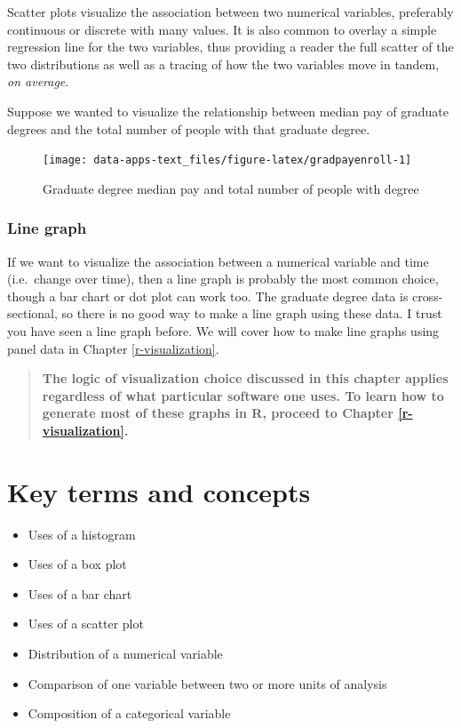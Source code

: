 \documentclass[
]{book}
\providecommand{\tightlist}{%
  \setlength{\itemsep}{0pt}\setlength{\parskip}{0pt}}
\begin{document}
Scatter plots visualize the association between two numerical variables, preferably continuous or discrete with many values. It is also common to overlay a simple regression line for the two variables, thus providing a reader the full scatter of the two distributions as well as a tracing of how the two variables move in tandem, \emph{on average}.

Suppose we wanted to visualize the relationship between median pay of graduate degrees and the total number of people with that graduate degree.

\begin{figure}

{\centering \texttt{[image: data-apps-text\_files/figure-latex/gradpayenroll-1]} 

}

\caption{Graduate degree median pay and total number of people with degree}\label{fig:gradpayenroll}
\end{figure}

\hypertarget{line-graph}{%
\subsubsection{Line graph}\label{line-graph}}

If we want to visualize the association between a numerical variable and time (i.e.~change over time), then a line graph is probably the most common choice, though a bar chart or dot plot can work too. The graduate degree data is cross-sectional, so there is no good way to make a line graph using these data. I trust you have seen a line graph before. We will cover how to make line graphs using panel data in Chapter \ref{r-visualization}.

\begin{quote}
\textbf{The logic of visualization choice discussed in this chapter applies regardless of what particular software one uses. To learn how to generate most of these graphs in R, proceed to Chapter \ref{r-visualization}.}
\end{quote}

\hypertarget{kt5}{%
\section{Key terms and concepts}\label{kt5}}

\begin{itemize}
\tightlist
\item
  Uses of a histogram
\item
  Uses of a box plot
\item
  Uses of a bar chart
\item
  Uses of a scatter plot
\item
  Distribution of a numerical variable
\item
  Comparison of one variable between two or more units of analysis
\item
  Composition of a categorical variable
\end{itemize}
\end{document}
